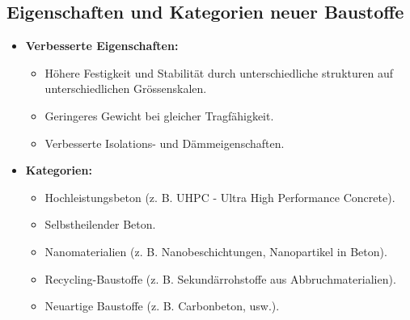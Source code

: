 \documentclass[
11pt,
captions=tableheading,
smallheadings,
headsepline,
footsepline, 
captions=tableheading,
parskip=half-,
]{scrartcl}
\begin{document}
\subsection{Eigenschaften und Kategorien neuer Baustoffe}
\begin{itemize}
    \item \textbf{Verbesserte Eigenschaften:}
          \begin{itemize}
              \item Höhere Festigkeit und Stabilität durch unterschiedliche strukturen auf unterschiedlichen Grössenskalen.
              \item Geringeres Gewicht bei gleicher Tragfähigkeit.
              \item Verbesserte Isolations- und Dämmeigenschaften.
          \end{itemize}
    \item \textbf{Kategorien:}
          \begin{itemize}
              \item Hochleistungsbeton (z. B. UHPC - Ultra High Performance Concrete).
              \item Selbstheilender Beton.
              \item Nanomaterialien (z. B. Nanobeschichtungen, Nanopartikel in Beton).
              \item Recycling-Baustoffe (z. B. Sekundärrohstoffe aus Abbruchmaterialien).
              \item Neuartige Baustoffe (z. B. Carbonbeton, usw.).
          \end{itemize}
\end{itemize}
\end{document}
